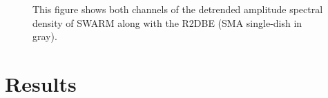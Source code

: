 \documentclass[11pt,preprint]{aastex}
\begin{document}
\begin{figure}[H]
\caption{This figure shows both channels of the detrended amplitude spectral density of SWARM along with the 
R2DBE (SMA single-dish in gray).}
\label{fig:swarm_amp_spec}
\end{figure}

\section{Results}

\acknowledgments 
\clearpage


\end{document}
